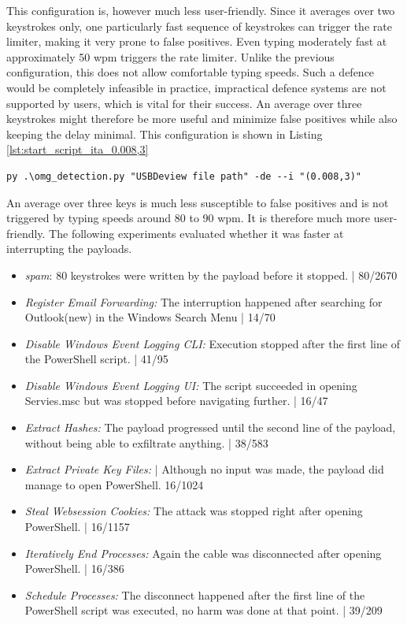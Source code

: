 This configuration is, however much less user-friendly. Since it averages over two keystrokes only, one particularly fast sequence of keystrokes can trigger the rate limiter, making it very prone to false positives. Even typing moderately fast at approximately 50 wpm triggers the rate limiter. Unlike the previous configuration, this does not allow comfortable typing speeds. Such a defence would be completely infeasible in practice, impractical defence systems are not supported by users, which is vital for their success. An average over three keystrokes might therefore be more useful and minimize false positives while also keeping the delay minimal. This configuration is shown in Listing  \ref{lst:start_script_ita_0.008,3}   
\begin{lstlisting}[caption={start defence Script with ITA (0.008,3)},label={lst:start_script_ita_0.008,3}, captionpos=b]
 py .\omg_detection.py "USBDeview file path" -de --i "(0.008,3)"
\end{lstlisting}

An average over three keys is much less susceptible to false positives and is not triggered by typing speeds around 80 to 90 wpm. It is therefore much more user-friendly. The following experiments evaluated whether it was faster at interrupting the payloads. 

\begin{itemize}
    \item  \emph{spam}: 80 keystrokes were written by the payload before it stopped. | 80/2670
    \item  \emph{Register Email Forwarding:} The interruption happened after searching for Outlook(new) in the Windows Search Menu  | 14/70 
    \item  \emph{Disable Windows Event Logging CLI:}  Execution stopped after the first line of the PowerShell script. | 41/95
    \item  \emph{Disable Windows Event Logging UI:} The script succeeded in opening Servies.msc but was stopped before navigating further. | 16/47
    \item  \emph{Extract Hashes:}  The payload progressed until the second line of the payload, without being able to exfiltrate anything. | 38/583
    \item  \emph{Extract Private Key Files:}  | Although no input was made, the payload did manage to open PowerShell. 16/1024
    \item  \emph{Steal Websession Cookies:} The attack was stopped right after opening PowerShell. | 16/1157
    \item  \emph{Iteratively End Processes:} Again the cable was disconnected after opening PowerShell. | 16/386
    \item  \emph{Schedule Processes:} The disconnect happened after the first line of the PowerShell script was executed, no harm was done at that point. | 39/209
\end{itemize}



